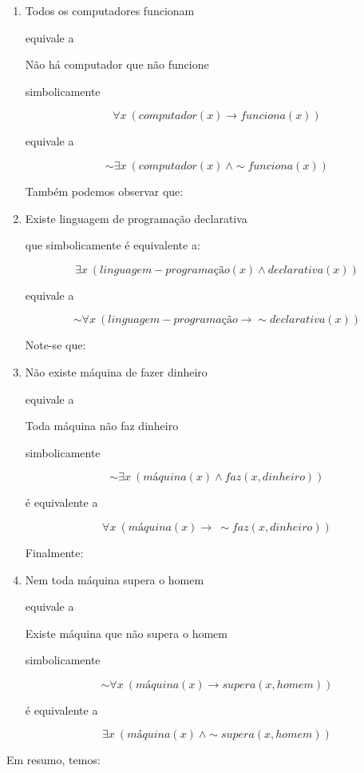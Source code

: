 \begin{enumerate}[label=(\roman*)]
    \item Todos os computadores funcionam

    equivale a

    \centerline{Não há computador que não funcione}

    simbolicamente

    $$\forall x\ (computador(x) \to funciona(x))$$

    equivale a

    $$\sim \exists x\ (computador(x)\ \land \sim funciona(x))$$

    \bigskip
    Também podemos observar que:

    \item Existe linguagem de programação declarativa

    que simbolicamente é equivalente a:

    $$\exists x\ (linguagem-programação(x) \land declarativa(x))$$

    equivale a

    $$\sim \forall x\ (linguagem-programação \to \sim declarativa(x))$$

    \bigskip
    Note-se que:
    \item Não existe máquina de fazer dinheiro

    equivale a

    \centerline{Toda máquina não faz dinheiro}

    simbolicamente

    $$\sim \exists x\ (máquina(x) \land faz(x, dinheiro))$$

    é equivalente a

    $$\forall x\ (máquina(x) \to\ \sim faz(x, dinheiro))$$

    \bigskip
    Finalmente:
    \item Nem toda máquina supera o homem

    equivale a

    \centerline{Existe máquina que não supera o homem}

    simbolicamente

    $$\sim \forall x\ (máquina(x) \to supera(x, homem))$$

    é equivalente a

    $$\exists x\ (máquina(x)\ \land \sim supera(x, homem))$$

\end{enumerate}

Em resumo, temos:

